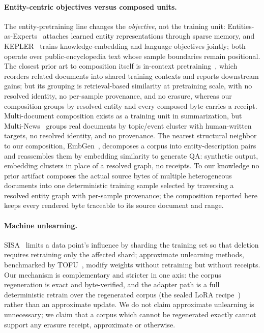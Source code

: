 \documentclass{article}
\begin{document}
\paragraph{Entity-centric objectives versus composed units.}
The entity-pretraining line changes the \emph{objective}, not the training unit: Entities-as-Experts~\cite{fevry2020entities} attaches learned entity representations through sparse memory, and KEPLER~\cite{wang2019kepler} trains knowledge-embedding and language objectives jointly; both operate over public-encyclopedia text whose sample boundaries remain positional. The closest prior art to composition itself is in-context pretraining~\cite{shi2023incontext}, which reorders related documents into shared training contexts and reports downstream gains; but its grouping is retrieval-based similarity at pretraining scale, with no resolved identity, no per-sample provenance, and no erasure, whereas our composition groups by resolved entity and every composed byte carries a receipt. Multi-document composition exists as a training unit in summarization, but Multi-News~\cite{fabbri2019multinews} groups real documents by topic/event cluster with human-written targets, no resolved identity, and no provenance. The nearest structural neighbor to our composition, EmbGen~\cite{lenin2026embgen}, decomposes a corpus into entity-description pairs and reassembles them by embedding similarity to generate QA: synthetic output, embedding clusters in place of a resolved graph, no receipts. To our knowledge no prior artifact composes the actual source bytes of multiple heterogeneous documents into one deterministic training sample selected by traversing a resolved entity graph with per-sample provenance; the composition reported here keeps every rendered byte traceable to its source document and range.

\paragraph{Machine unlearning.}
SISA~\cite{bourtoule2020machine} limits a data point's influence by sharding the training set so that deletion requires retraining only the affected shard; approximate unlearning methods, benchmarked by TOFU~\cite{maini2024tofu}, modify weights without retraining but without receipts. Our mechanism is complementary and stricter in one axis: the corpus regeneration is exact and byte-verified, and the adapter path is a full deterministic retrain over the regenerated corpus (the sealed LoRA recipe~\cite{hu_lora}) rather than an approximate update. We do not claim approximate unlearning is unnecessary; we claim that a corpus which cannot be regenerated exactly cannot support any erasure receipt, approximate or otherwise.
\end{document}
